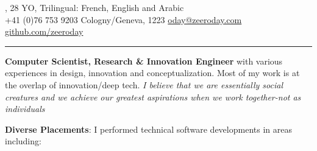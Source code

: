 \documentclass[a4paper, 10pt]{article}
\begin{document}

\begin{center}

\color{headings}\textsc{\Huge{}}, 28 YO, \small{Trilingual: French, English and Arabic}\\
\vspace{1mm}
\color{text1}{\large\Telefon} +41 (0)76 753 9203 
\hfill {\large\faMapMarker} Cologny/Geneva, 1223 
\hfill {\large\faEnvelope} \href{mailto:oday@zeeroday.com}{oday@zeeroday.com} 
\hfill \color{text1}{\large\faGithub} \href{https://github.com/zeeroday}{github.com/zeeroday}
\hfill {}

\rule{\textwidth}{2pt}

\vspace{-5pt}
\begin{flushleft}
	\textbf{Computer Scientist, Research \& Innovation Engineer}  with various experiences in design, innovation and conceptualization. Most of my work is at the overlap of innovation/deep tech. \textit{I believe that we are essentially social creatures and we achieve our greatest aspirations when we work together-not as individuals}
\end{flushleft}
\begin{center}
\textbf{\fontsize{11pt}{11}\selectfont Diverse Placements}: I performed technical software developments in areas including:

\space
{}
\space
{}
\space
{}
\end{center}


\end{center}
\end{document}
